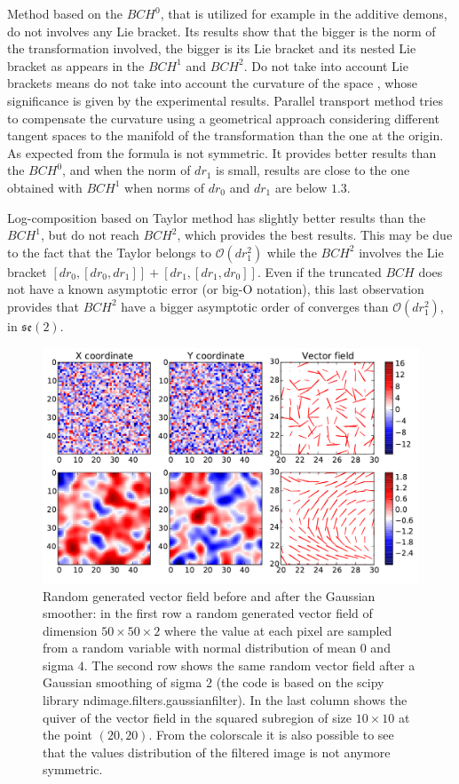 Method based on the $BCH^0$, that is utilized for example in the additive demons, do not involves any Lie bracket. Its results show that the bigger is the norm of the transformation involved, the bigger is its Lie bracket and its nested Lie bracket as appears in the $BCH^1$ and $BCH^2$. Do not take into account Lie brackets means do not take into account the curvature of the space \cite{misner1973gravitation}, whose significance is given by the experimental results. Parallel transport method tries to compensate the curvature using a geometrical approach considering different tangent spaces to the manifold of the transformation than the one at the origin. As expected from the formula is not symmetric. It provides better results than the $BCH^0$, and when the norm of $dr_1$ is small, results are close to the one obtained with $BCH^1$ when norms of $dr_0$ and $dr_1$ are below $1.3$.

Log-composition based on Taylor method has slightly better results than the $BCH^1$, but do not reach $BCH^2$, which provides the best results. This may be due to the fact that the Taylor belongs to $\mathcal{O}(dr_1^2)$ while the $BCH^2$ involves the Lie bracket $[dr_0,[dr_0, dr_1]] + [dr_1,[dr_1, dr_0]]$. Even if the truncated $BCH$ does not have a known asymptotic error (or big-O notation), this last observation provides that $BCH^2$ have a bigger asymptotic order of converges than $\mathcal{O}(dr_1^2)$, in $\mathfrak{se}(2)$.
%
\begin{figure}[!ht]
	\includegraphics[scale=0.70]{figures/svf_gaussian_smoothing_effects.pdf}
	\caption{Random generated vector field before and after the Gaussian smoother: in the first row a random generated vector field of dimension $50\times 50 \times 2$ where the value at each pixel are sampled from a random variable with normal distribution of mean $0$ and sigma $4$. The second row shows the same random vector field after a Gaussian smoothing of sigma $2$ (the code is based on the scipy library ndimage.filters.gaussian\textunderscore filter). In the last column shows the quiver of the vector field in the squared subregion of size $10\times 10$ at the point $(20,20)$. From the colorscale it is also possible to see that the values distribution of the filtered image is not anymore symmetric. }
	\label{fig:SVF_gaussian_smoothing_effects}
\end{figure}

